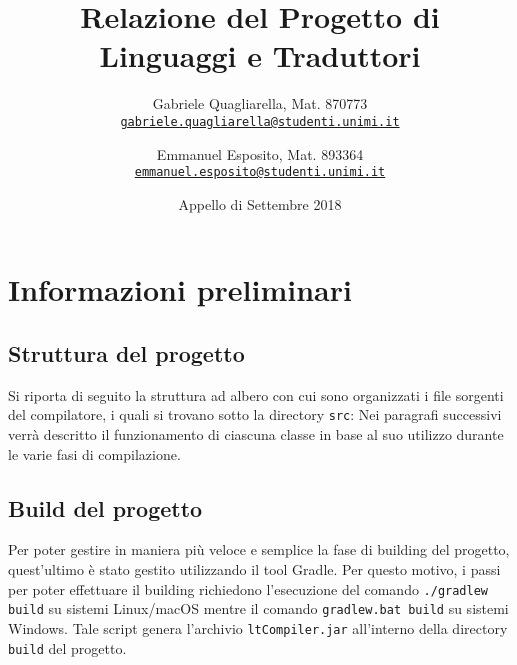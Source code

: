 \documentclass[10pt,a4paper]{article}
\date{Appello di Settembre 2018}
\author{
  Gabriele Quagliarella, Mat. 870773\\
  \texttt{\href{mailto:gabriele.quagliarella@studenti.unimi.it}{gabriele.quagliarella@studenti.unimi.it}}
  \and 
  Emmanuel Esposito, Mat. 893364\\
  \texttt{\href{mailto:emmanuel.esposito@studenti.unimi.it}{emmanuel.esposito@studenti.unimi.it}}
}
\title{Relazione del Progetto di Linguaggi e Traduttori}
\begin{document}
\maketitle
\tableofcontents

\pagebreak

\section{Informazioni preliminari}

\subsection{Struttura del progetto}
Si riporta di seguito la struttura ad albero con cui sono organizzati i file sorgenti del compilatore, i quali si trovano sotto la directory \texttt{src}:
\vspace{10pt}
\vspace{10pt}
Nei paragrafi successivi verrà descritto il funzionamento di ciascuna classe in base al suo utilizzo durante le varie fasi di compilazione.

\subsection{Build del progetto}
Per poter gestire in maniera più veloce e semplice la fase di building del progetto, quest'ultimo è stato gestito utilizzando il tool Gradle.
Per questo motivo, i passi per poter effettuare il building richiedono l'esecuzione del comando \texttt{./gradlew build} su sistemi Linux/macOS mentre il comando \texttt{gradlew.bat build} su sistemi Windows.
Tale script genera l'archivio \texttt{ltCompiler.jar} all'interno della directory \texttt{build} del progetto.
\end{document}
